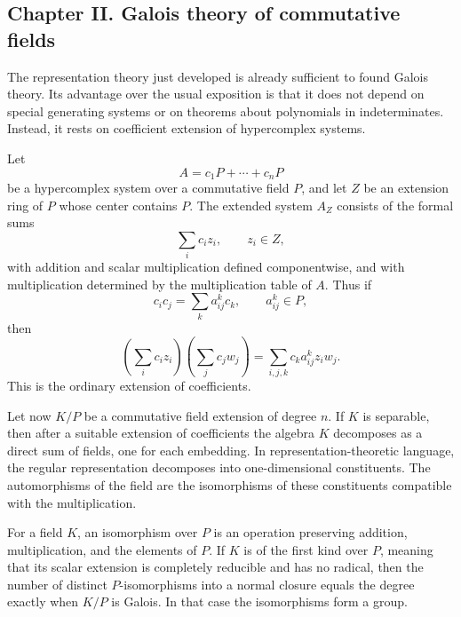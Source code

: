 \documentclass[12pt]{article}
\begin{document}
\subsection{Chapter II. Galois theory of commutative fields}

The representation theory just developed is already sufficient to found Galois theory. Its advantage over the usual exposition is that it does not depend on special generating systems or on theorems about polynomials in indeterminates. Instead, it rests on coefficient extension of hypercomplex systems.

Let
\[
  A=c_1P+
\cdots+c_nP
\]
be a hypercomplex system over a commutative field \(P\), and let \(Z\) be an extension ring of \(P\) whose center contains \(P\). The extended system \(A_Z\) consists of the formal sums
\[
  \sum_i c_i z_i,
  \qquad z_i\in Z,
\]
with addition and scalar multiplication defined componentwise, and with multiplication determined by the multiplication table of \(A\). Thus if
\[
  c_ic_j=\sum_k a_{ij}^k c_k,
  \qquad a_{ij}^k\in P,
\]
then
\[
  \left(\sum_i c_i z_i\right)
  \left(\sum_j c_j w_j\right)
  =\sum_{i,j,k} c_k a_{ij}^k z_iw_j.
\]
This is the ordinary extension of coefficients.

Let now \(K/P\) be a commutative field extension of degree \(n\). If \(K\) is separable, then after a suitable extension of coefficients the algebra \(K\) decomposes as a direct sum of fields, one for each embedding. In representation-theoretic language, the regular representation decomposes into one-dimensional constituents. The automorphisms of the field are the isomorphisms of these constituents compatible with the multiplication.

For a field \(K\), an isomorphism over \(P\) is an operation preserving addition, multiplication, and the elements of \(P\). If \(K\) is of the first kind over \(P\), meaning that its scalar extension is completely reducible and has no radical, then the number of distinct \(P\)-isomorphisms into a normal closure equals the degree exactly when \(K/P\) is Galois. In that case the isomorphisms form a group.
\end{document}
